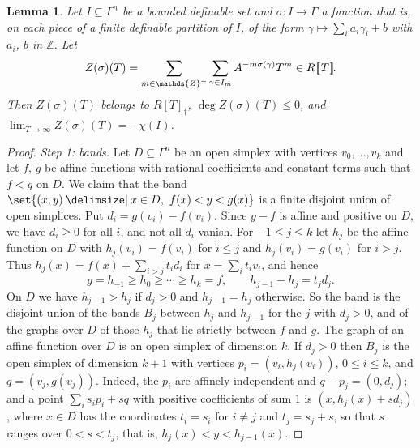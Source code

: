 \documentclass[12pt]{amsart}
\theoremstyle{plain}
\newtheorem{lem}[thm]{Lemma}
\theoremstyle{definition}
\theoremstyle{remark}
\numberwithin{equation}{section}
\theoremstyle{plain}
\newcommand{\Z}{\mathds{Z}}
\newcommand{\0}{\emptyset}
\newcommand{\dbra}[1]{%
  \,[\mkern-6.8mu[\, #1 \,]\mkern-6.8mu]}
\newcommand{\limplies}{\rightarrow}
\newcommand{\fun}{\longrightarrow}
\newcommand{\efun}{\longmapsto}
\newcommand{\sub}{\subseteq}
\providecommand\given{}
\newcommand\SetSymbol[1][]{%
\nonscript \: #1 \vert
\allowbreak
\nonscript\:
\mathopen{}}
\renewcommand\given{\SetSymbol[\delimsize]}
\begin{document}
\begin{lem}\label{lat:zeta}
Let $I \sub \Gamma^n$ be a bounded definable set and $\sigma : I \fun \Gamma$ a function that is, on each piece of a finite definable partition of $I$, of the form $\gamma \efun \sum_i a_i \gamma_i + b$ with $a_i$, $b$ in $\Z$. Let
\[
Z(\sigma)(T) = \sum_{m \in \Z^+} \sum_{\gamma \in I_{m}} A^{-m \sigma(\gamma)} T^m \in R \dbra T.
\]
Then $Z(\sigma)(T)$ belongs to $R[T]_{\dag}$, $\deg Z(\sigma)(T) \leq 0$, and $\lim_{T \limplies \infty}Z(\sigma)(T) = -\chi(I)$.
\end{lem}
\begin{proof}
\emph{Step 1: bands.} Let $D \sub \Gamma^{n}$ be an open simplex with vertices $v_0, \ldots, v_k$ and let $f$, $g$ be affine functions with rational coefficients and constant terms such that $f < g$ on $D$. We claim that the band $\set{(x, y) \given x \in D, \ f(x) < y < g(x)}$ is a finite disjoint union of open simplices. Put $d_i = g(v_i) - f(v_i)$. Since $g - f$ is affine and positive on $D$, we have $d_i \geq 0$ for all $i$, and not all $d_i$ vanish. For $-1 \leq j \leq k$ let $h_j$ be the affine function on $D$ with $h_j(v_i) = f(v_i)$ for $i \leq j$ and $h_j(v_i) = g(v_i)$ for $i > j$. Thus $h_j(x) = f(x) + \sum_{i > j} t_i d_i$ for $x = \sum_i t_i v_i$, and hence
\[
g = h_{-1} \geq h_0 \geq \cdots \geq h_k = f, \qquad h_{j-1} - h_j = t_j d_j .
\]
On $D$ we have $h_{j-1} > h_j$ if $d_j > 0$ and $h_{j-1} = h_j$ otherwise. So the band is the disjoint union of the bands $B_j$ between $h_j$ and $h_{j-1}$ for the $j$ with $d_j > 0$, and of the graphs over $D$ of those $h_j$ that lie strictly between $f$ and $g$. The graph of an affine function over $D$ is an open simplex of dimension $k$. If $d_j > 0$ then $B_j$ is the open simplex of dimension $k+1$ with vertices $p_i = (v_i, h_j(v_i))$, $0 \leq i \leq k$, and $q = (v_j, g(v_j))$. Indeed, the $p_i$ are affinely independent and $q - p_j = (0, d_j)$; and a point $\sum_i s_i p_i + s q$ with positive coefficients of sum $1$ is $(x, h_j(x) + s d_j)$, where $x \in D$ has the coordinates $t_i = s_i$ for $i \neq j$ and $t_j = s_j + s$, so that $s$ ranges over $0 < s < t_j$, that is, $h_j(x) < y < h_{j-1}(x)$.


\end{proof}
\end{document}
